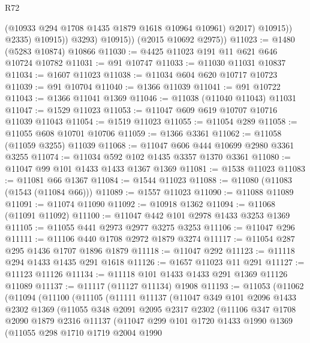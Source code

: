 \begin{lexlean}{R72}
\begin{coremodule}
                        (@10933 @294 @1708 @1435 @1879 @1618 @10964 @10961)
                        @2017)
                      @10915))
                  @2335)
                @10915))
            @3293)
          @10915))
      (@2015 @10692 @2975))
@11023 := @1480 (@5283 @10874) @10866
@11030 := @4425 @11023 @191 @11 @621 @646 @10724 @10782
@11031 := @91 @10747
@11033 := @11030 @11031 @10837
@11034 := @1607 @11023
@11038 := @11034 @604 @620 @10717 @10723
@11039 := @91 @10704
@11040 := @1366 @11039
@11041 := @91 @10722
@11043 := @1366 @11041 @1369
@11046 := @11038 (@11040 @11043) @11031
@11047 := @1529 @11023
@11053 := @11047 @609 @619 @10707 @10716 @11039 @11043
@11054 := @1519 @11023
@11055 := @11054 @289
@11058 := @11055 @608 @10701 @10706
@11059 := @1366 @3361
@11062 := @11058 (@11059 @3255) @11039
@11068 := @11047 @606 @444 @10699 @2980 @3361 @3255
@11074 := @11034 @592 @102 @1435 @3357 @1370 @3361
@11080 := @11047 @99 @101 @1433 @1433 @1367 @1369
@11081 := @1538 @11023
@11083 := @11081 @66 @1367
@11084 := @1544 @11023
@11088 := @11080 (@11083 (@1543 (@11084 @66)))
@11089 := @1557 @11023
@11090 := @11088 @11089
@11091 := @11074 @11090
@11092 := @10918 @1362
@11094 := @11068 (@11091 @11092)
@11100 := @11047 @442 @101 @2978 @1433 @3253 @1369
@11105 := @11055 @441 @2973 @2977 @3275 @3253
@11106 := @11047 @296
@11111 := @11106 @440 @1708 @2972 @1879 @3274
@11117 := @11054 @287 @295 @1436 @1707 @1896 @1879
@11118 := @11047 @292
@11123 := @11118 @294 @1433 @1435 @291 @1618
@11126 := @1657 @11023 @11 @291
@11127 := @11123 @11126
@11134 := @11118 @101 @1433 @1433 @291 @1369 @11126 @11089
@11137 := @11117 (@11127 @11134) @1908
@11193 := @11053
    (@11062
      (@11094
        (@11100
          (@11105
            (@11111
              @11137
              (@11047
                @349
                @101
                @2096
                @1433
                @2302
                @1369
                (@11055
                  @348
                  @2091
                  @2095
                  @2317
                  @2302
                  (@11106
                    @347
                    @1708
                    @2090
                    @1879
                    @2316
                    @11137
                    (@11047
                      @299
                      @101
                      @1720
                      @1433
                      @1990
                      @1369
                      (@11055
                        @298
                        @1710
                        @1719
                        @2004
                        @1990

\end{coremodule}
\end{lexlean}
